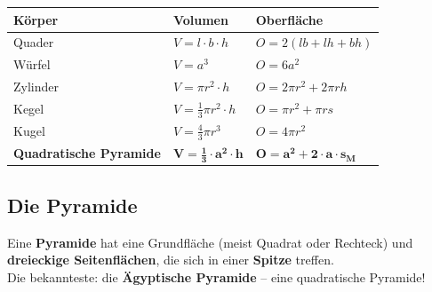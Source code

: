 \documentclass[12pt, a4paper]{article}
\begin{document}
\begin{formulabox}
\renewcommand{\arraystretch}{1.8}
\begin{tabular}{lll}
  \toprule
  \textbf{K\"orper} & \textbf{Volumen} & \textbf{Oberfl\"ache} \\
  \midrule
  Quader      & $V = l \cdot b \cdot h$            & $O = 2(lb+lh+bh)$ \\
  W\"urfel     & $V = a^3$                           & $O = 6a^2$ \\
  Zylinder    & $V = \pi r^2 \cdot h$               & $O = 2\pi r^2 + 2\pi r h$ \\
  Kegel       & $V = \frac{1}{3}\pi r^2 \cdot h$    & $O = \pi r^2 + \pi r s$ \\
  Kugel       & $V = \frac{4}{3}\pi r^3$            & $O = 4\pi r^2$ \\
  \textbf{Quadratische Pyramide} & $\mathbf{V = \frac{1}{3} \cdot a^2 \cdot h}$ &
    $\mathbf{O = a^2 + 2 \cdot a \cdot s_M}$ \\
  \bottomrule
\end{tabular}
\end{formulabox}

\subsection{Die Pyramide}

\begin{merkbox}
Eine \textbf{Pyramide} hat eine Grundfl\"ache (meist Quadrat oder Rechteck) und
\textbf{dreieckige Seitenfl\"achen}, die sich in einer \textbf{Spitze} treffen.\\[0.2cm]
Die bekannteste: die \textbf{\"Agyptische Pyramide} -- eine quadratische Pyramide!
\end{merkbox}
\end{document}
